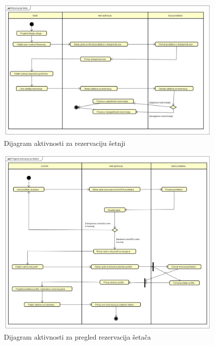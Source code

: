 		\begin{figure}[H]
			\includegraphics[scale=0.4]{dijagrami/Rezervacija_setnji.png}
			\centering
			\caption{Dijagram aktivnosti za rezervaciju šetnji}
			\label{fig:activity_diagram_8}
		\end{figure}

		\begin{figure}[H]
			\includegraphics[scale=0.4]{dijagrami/Pregled_rezervacija_za_setaca.png}
			\centering
			\caption{Dijagram aktivnosti za pregled rezervacija šetača}
			\label{fig:activity_diagram_9}
		\end{figure}


